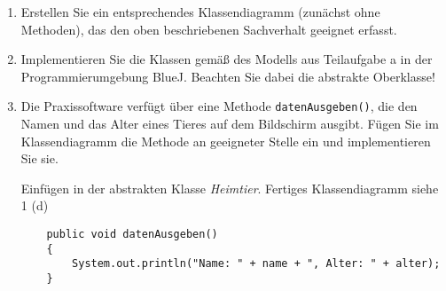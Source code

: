 \documentclass{lehramt-informatik-haupt}
\begin{document}
\renewcommand{\labelenumi}{(\alph{enumi})}
\begin{enumerate}


\item Erstellen Sie ein entsprechendes Klassendiagramm (zunächst ohne
Methoden), das den oben beschriebenen Sachverhalt geeignet erfasst.



\item Implementieren Sie die Klassen gemäß des Modells aus Teilaufgabe a
in der Programmierumgebung BlueJ. Beachten Sie dabei die abstrakte
Oberklasse!






\item Die Praxissoftware verfügt über eine Methode
\verb|datenAusgeben()|, die den Namen und das Alter eines Tieres auf dem
Bildschirm ausgibt. Fügen Sie im Klassendiagramm die Methode an
geeigneter Stelle ein und implementieren Sie sie.

\begin{antwort}
Einfügen in der abstrakten Klasse \emph{Heimtier}. Fertiges
Klassendiagramm siehe 1 (d)

\begin{verbatim}
    public void datenAusgeben()
    {
        System.out.println("Name: " + name + ", Alter: " + alter);
    }
\end{verbatim}
\end{antwort}


\end{enumerate}
\end{document}
